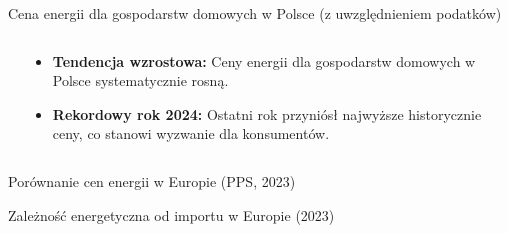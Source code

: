\begin{frame}{Cena energii dla gospodarstw domowych w Polsce (z uwzględnieniem podatków)}
    \begin{columns}
        \begin{column}{0.6\textwidth}
        \end{column}
        
        \begin{column}{0.4\textwidth}
             \begin{tcolorbox}[colback=coalplant!10, colframe=coalplant!80!black, title=Kluczowe obserwacje]
                \begin{itemize}
                    \item[\faIcon{arrow-up}] \textbf{Tendencja wzrostowa:} Ceny energii dla gospodarstw domowych w Polsce systematycznie rosną.
                    \item[\faIcon{exclamation-triangle}] \textbf{Rekordowy rok 2024:} Ostatni rok przyniósł najwyższe historycznie ceny, co stanowi wyzwanie dla konsumentów.
                \end{itemize}
            \end{tcolorbox}
        \end{column}
    \end{columns}
\end{frame}

\begin{frame}{Porównanie cen energii w Europie (PPS, 2023)}
\end{frame}

\begin{frame}{Zależność energetyczna od importu w Europie (2023)}
\end{frame}
